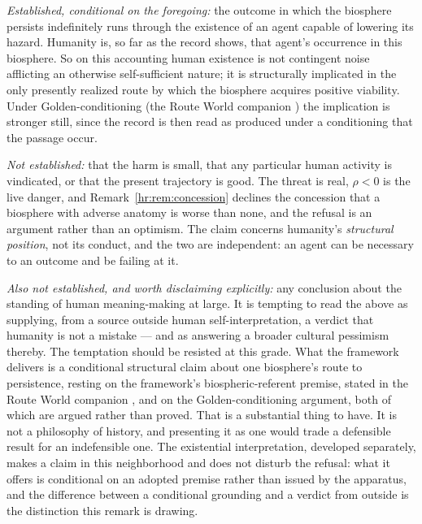 \begin{remark}\label{hr:rem:notmistake}
\emph{Established, conditional on the foregoing:} the outcome in which
the biosphere persists indefinitely runs through the existence of an
agent capable of lowering its hazard. Humanity is, so far as the record
shows, that agent's occurrence in this biosphere. So on this accounting
human existence is not contingent noise afflicting an otherwise
self-sufficient nature; it is structurally implicated in the only
presently realized route by which the biosphere acquires positive
viability. Under Golden-conditioning
(the Route World companion \cite{GoldenRouteWorld}) the implication is stronger still, since the record is
then read as produced under a conditioning that the passage occur.

\emph{Not established:} that the harm is small, that any particular
human activity is vindicated, or that the present trajectory is good.
The threat is real, $\rho<0$ is the live danger, and
Remark~\ref{hr:rem:concession} declines the concession that a biosphere
with adverse anatomy is worse than none, and the refusal is an argument
rather than an optimism. The claim concerns humanity's
\emph{structural position}, not its conduct, and the two are
independent: an agent can be necessary to an outcome and be failing at
it.

\emph{Also not established, and worth disclaiming explicitly:} any
conclusion about the standing of human meaning-making at large. It is
tempting to read the above as supplying, from a source outside human
self-interpretation, a verdict that humanity is not a mistake --- and as
answering a broader cultural pessimism thereby. The temptation should be
resisted at this grade. What the framework delivers is a conditional
structural claim about one biosphere's route to persistence, resting on
the framework's biospheric-referent premise, stated in the Route World companion \cite{GoldenRouteWorld}, and on the Golden-conditioning argument, both of which are
argued rather than proved. That is a substantial thing to have. It is
not a philosophy of history, and presenting it as one would trade a
defensible result for an indefensible one. The existential interpretation, developed separately, makes a
claim in this neighborhood and does not disturb the refusal: what it offers
is conditional on an adopted premise rather than issued by the
apparatus, and the difference between a conditional grounding and a verdict
from outside is the distinction this remark is drawing.
\end{remark}


